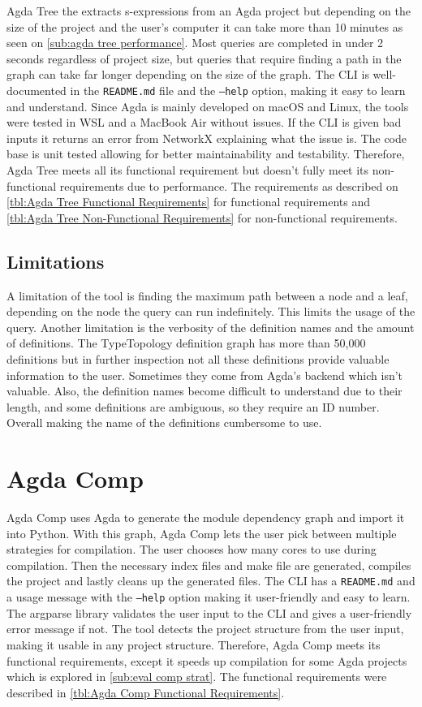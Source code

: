 Agda Tree the extracts s-expressions from an Agda project but depending on the
size of the project and the user's computer it can take more than 10 minutes as
seen on \cref{sub:agda tree performance}. Most queries are completed in under 2
seconds regardless of project size, but queries that require finding a path in
the graph can take far longer depending on the size of the graph. The CLI is
well-documented in the \texttt{README.md} file and the \texttt{--help} option,
making it easy to learn and understand. Since Agda is mainly developed on macOS
and Linux, the tools were tested in WSL and a MacBook Air without issues. If
the CLI is given bad inputs it returns an error from NetworkX explaining what
the issue is. The code base is unit tested allowing for better maintainability
and testability. Therefore, Agda Tree meets all its functional requirement but
doesn't fully meet its non-functional requirements due to performance. The
requirements as described on \cref{tbl:Agda Tree Functional Requirements} for
functional requirements and \cref{tbl:Agda Tree Non-Functional Requirements}
for non-functional requirements.

\subsection{Limitations}

A limitation of the tool is finding the maximum path between a node and a leaf,
depending on the node the query can run indefinitely. This limits the usage of
the query. Another limitation is the verbosity of the definition names and the
amount of definitions. The TypeTopology definition graph has more than 50,000
definitions but in further inspection not all these definitions provide
valuable information to the user. Sometimes they come from Agda's backend which
isn't valuable. Also, the definition names become difficult to understand due
to their length, and some definitions are ambiguous, so they require an ID
number. Overall making the name of the definitions cumbersome to use.


\section{Agda Comp} \label{sec:eval agda comp}

Agda Comp uses Agda to generate the module dependency graph and import it into
Python. With this graph, Agda Comp lets the user pick between multiple
strategies for compilation. The user chooses how many cores to use during
compilation. Then the necessary index files and make file are generated,
compiles the project and lastly cleans up the generated files. The CLI has a
\texttt{README.md} and a usage message with the \texttt{--help} option making
it user-friendly and easy to learn. The argparse library validates the user
input to the CLI and gives a user-friendly error message if not. The tool
detects the project structure from the user input, making
it usable in any project structure. Therefore, Agda Comp meets its
functional requirements, except it speeds up compilation for some Agda projects
which is explored in \cref{sub:eval comp strat}. The functional
requirements were described in \cref{tbl:Agda Comp Functional Requirements}.

